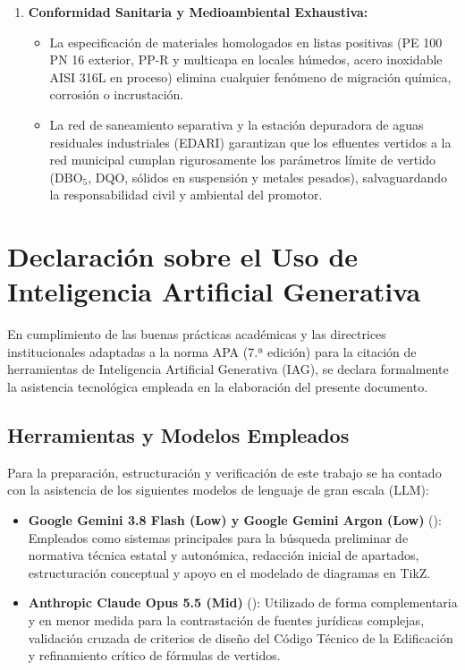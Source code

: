 \documentclass{report}
\begin{document}
\begin{enumerate}
    \item \textbf{Conformidad Sanitaria y Medioambiental Exhaustiva:}
          \begin{itemize}
              \item La especificación de materiales homologados en listas positivas (PE 100 PN 16 exterior, PP-R y multicapa en locales húmedos, acero inoxidable AISI 316L en proceso) elimina cualquier fenómeno de migración química, corrosión o incrustación.
              \item La red de saneamiento separativa y la estación depuradora de aguas residuales industriales (EDARI) garantizan que los efluentes vertidos a la red municipal cumplan rigurosamente los parámetros límite de vertido (DBO$_5$, DQO, sólidos en suspensión y metales pesados), salvaguardando la responsabilidad civil y ambiental del promotor.
          \end{itemize}
\end{enumerate}

\chapter*{Declaración sobre el Uso de Inteligencia Artificial Generativa}

En cumplimiento de las buenas prácticas académicas y las directrices institucionales adaptadas a la norma APA (7.ª edición) para la citación de herramientas de Inteligencia Artificial Generativa (IAG), se declara formalmente la asistencia tecnológica empleada en la elaboración del presente documento.

\section*{Herramientas y Modelos Empleados}
Para la preparación, estructuración y verificación de este trabajo se ha contado con la asistencia de los siguientes modelos de lenguaje de gran escala (LLM):
\begin{itemize}
    \item \textbf{Google Gemini 3.8 Flash (Low) y Google Gemini Argon (Low)} (\cite{google_gemini_2026}): Empleados como sistemas principales para la búsqueda preliminar de normativa técnica estatal y autonómica, redacción inicial de apartados, estructuración conceptual y apoyo en el modelado de diagramas en TikZ.
    \item \textbf{Anthropic Claude Opus 5.5 (Mid)} (\cite{anthropic_claude_2026}): Utilizado de forma complementaria y en menor medida para la contrastación de fuentes jurídicas complejas, validación cruzada de criterios de diseño del Código Técnico de la Edificación y refinamiento crítico de fórmulas de vertidos.
\end{itemize}
\end{document}
